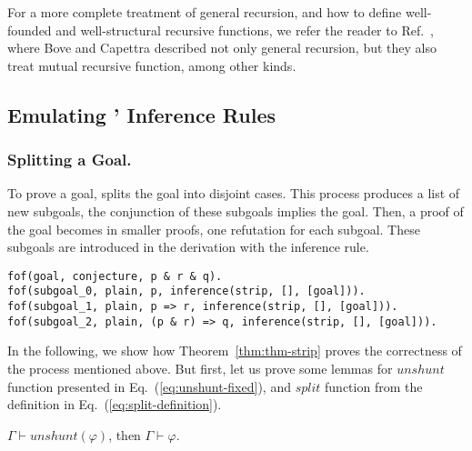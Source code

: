 \documentclass[../main.tex]{subfiles}
\begin{document}
For a more complete treatment of general recursion, and how to
define well-founded and well-structural recursive functions, we refer
the reader to Ref.~\cite{Bove2005}, where Bove and Capettra described
not only general recursion, but they also treat mutual recursive
function, among other kinds.


\subsection{Emulating \Metis' Inference Rules}
\label{ssec:emulating-inferences}


\subsubsection{Splitting a Goal.}
\label{sssec:splitting-goal}

 To prove a goal, \Metis splits the goal into
disjoint cases. This process produces a list of new subgoals, the
conjunction of these subgoals implies the goal. Then, a proof of the
goal becomes in smaller proofs, one refutation for each subgoal.
These subgoals are introduced in the \TSTP derivation with the \strip
inference rule.

\begin{verbatim}
fof(goal, conjecture, p & r & q).
fof(subgoal_0, plain, p, inference(strip, [], [goal])).
fof(subgoal_1, plain, p => r, inference(strip, [], [goal])).
fof(subgoal_2, plain, (p & r) => q, inference(strip, [], [goal])).
\end{verbatim}

In the following, we show how Theorem~\ref{thm:thm-strip} proves the
correctness of the process mentioned above. But first, let us prove some
lemmas for $unshunt$ function presented in Eq.~(\ref{eq:unshunt-fixed}),
and $split$ function from the definition in Eq.~(\ref{eq:split-definition}).

\begin{lemma}
  \label{lem:unshunt}
  $Γ ⊢ unshunt(φ)$, then $Γ ⊢ φ$.
\end{lemma}
\end{document}

